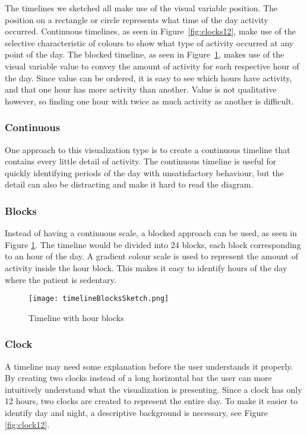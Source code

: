 The timelines we sketched all make use of the visual variable position. The position on a rectangle or circle represents what time of the day activity occurred. Continuous timelines, as seen in Figure~\ref{fig:clocks12}, make use of the selective characteristic of colours to show what type of activity occurred at any point of the day. The blocked timeline, as seen in Figure~\ref{fig:timelineBlocks}, makes use of the visual variable value to convey the amount of activity for each respective hour of the day. Since value can be ordered, it is easy to see which hours have activity, and that one hour has more activity than another. Value is not qualitative however, so finding one hour with twice as much activity as another is difficult.

\subsubsection{Continuous}
One approach to this visualization type is to create a continuous timeline that contains every little detail of activity. The continuous timeline is useful for quickly identifying periods of the day with unsatisfactory behaviour, but the detail can also be distracting and make it hard to read the diagram.

\subsubsection{Blocks}
Instead of having a continuous scale, a blocked approach can be used, as seen in Figure \ref{fig:timelineBlocks}. The timeline would be divided into 24 blocks, each block corresponding to an hour of the day. A gradient colour scale is used to represent the amount of activity inside the hour block. This makes it easy to identify hours of the day where the patient is sedentary. 

\begin{figure}[h!]
	\centering
		\texttt{[image: timelineBlocksSketch.png]}
		\caption[T2 sketch]{Timeline with hour blocks}
		\label{fig:timelineBlocks}
\end{figure}

\subsubsection{Clock}
A timeline may need some explanation before the user understands it properly. By creating two clocks instead of a long horizontal bar the user can more intuitively understand what the visualization is presenting. Since a clock has only 12 hours, two clocks are created to represent the entire day. To make it easier to identify day and night, a descriptive background is necessary, see Figure \ref{fig:clock12}.

